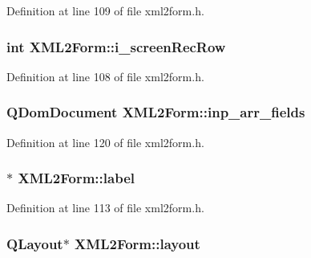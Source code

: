 Definition at line 109 of file xml2form.h.

\hypertarget{classXML2Form_a11097ff5d10cd176646e3c154405c035}{
\subsubsection[{i\_\-screenRecRow}]{\setlength{\rightskip}{0pt plus 5cm}int {\bf XML2Form::i\_\-screenRecRow}}}
\label{classXML2Form_a11097ff5d10cd176646e3c154405c035}


Definition at line 108 of file xml2form.h.

\hypertarget{classXML2Form_ac74f0507d6417126e8f10a81f659d51d}{
\subsubsection[{inp\_\-arr\_\-fields}]{\setlength{\rightskip}{0pt plus 5cm}QDomDocument {\bf XML2Form::inp\_\-arr\_\-fields}}}
\label{classXML2Form_ac74f0507d6417126e8f10a81f659d51d}


Definition at line 120 of file xml2form.h.

\hypertarget{classXML2Form_ade9a27a26e1d017fd4f851b5007741af}{
\subsubsection[{label}]{$\ast$ {\bf XML2Form::label}}}
\label{classXML2Form_ade9a27a26e1d017fd4f851b5007741af}


Definition at line 113 of file xml2form.h.

\hypertarget{classXML2Form_a23039ea01dc3a50ee859e12b645774b5}{
\subsubsection[{layout}]{\setlength{\rightskip}{0pt plus 5cm}QLayout$\ast$ {\bf XML2Form::layout}}}
\label{classXML2Form_a23039ea01dc3a50ee859e12b645774b5}



